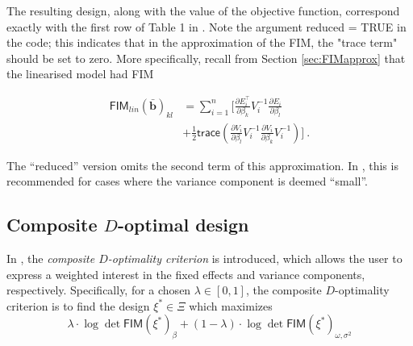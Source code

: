 \documentclass{article}
\theoremstyle{example}
\begin{document}
	The resulting design, along with the value of the objective function, correspond exactly with the first row of Table 1 in \cite{Wang2012}.
	Note the argument \textsf{reduced = TRUE} in the code; this indicates that in the approximation of the \textsf{FIM}, the "trace term" should be set to zero.
	More specifically, recall from Section \ref{sec:FIMapprox} that the linearised model had \textsf{FIM}

	\begin{align*}
	\textsf{FIM}_{lin} (\bar{\mathbf b} )_{kl}
	&=
	\sum_{i=1}^n
	\bigg[
	\frac{\partial E_i^\top}{\partial \beta_k} 
	V_i^{-1} 
	\frac{\partial E_i}{\partial \beta_l} \\
	&+
	\frac 1 2
	\textsf{trace}
	\left(
	\frac{\partial V_i}{\partial \beta_l}
	V_i^{-1}
	\frac{\partial V_i}{\partial \beta_k}
	V_i^{-1}
	\right) \bigg]
	\ .
	\end{align*}

	The ``reduced'' version omits the second term of this approximation.
	In \cite{Wang2012}, this is recommended for cases where the variance component is deemed ``small''.

	

\subsection{Composite $D$-optimal design}

	In \cite{Wang2012}, the \emph{composite $D$-optimality criterion} is introduced, which allows the user to express a weighted interest in the fixed effects and variance components, respectively.
	Specifically, for a chosen $\lambda \in [0,1]$, the composite $D$-optimality criterion is to find the design $\xi^\ast \in \Xi$ which maximizes
	\[
	\lambda \cdot \log \det \textsf{FIM} (\xi^\ast)_\beta  + 	(1-\lambda ) \cdot \log \det \textsf{FIM} (\xi^\ast)_{\omega, \sigma^2}
	\]
	
\end{document}
